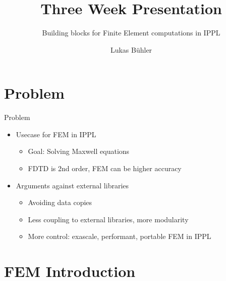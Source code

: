 \documentclass[handout,xcolor=pdftex,table,10pt,yellow,mathserif]{beamer}
\title{Three Week Presentation}
\subtitle{Building blocks for Finite Element computations in
IPPL}
\author{Lukas Bühler}
\date{\displaydate{presdate}}
\begin{document}
 \frame{
 \maketitle
}
%
 \frame{
 \tableofcontents
}


\section{Problem}

\begin{frame}{Problem}

\begin{itemize}
    \item Usecase for FEM in IPPL
        \pause
        \begin{itemize}
            \item Goal: Solving Maxwell equations
            \item FDTD is 2nd order, FEM can be higher accuracy
        \end{itemize}
        \pause
    \item Arguments against external libraries
        \pause
        \begin{itemize}
            \item Avoiding data copies
            \item Less coupling to external libraries, more modularity
            \item More control: exascale, performant, portable FEM in IPPL
        \end{itemize}
\end{itemize}

\end{frame}

\section{FEM Introduction}
\end{document}
